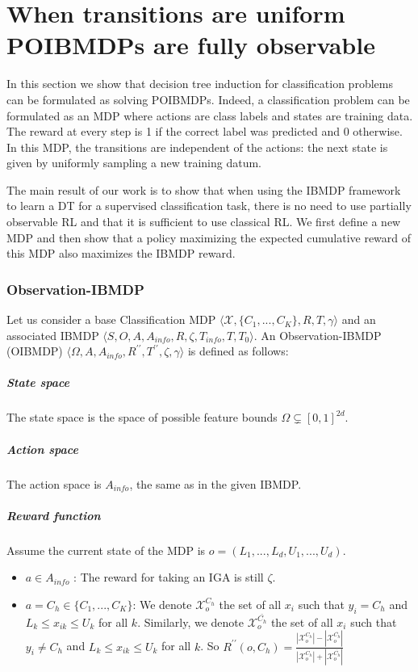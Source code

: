 \chapter{When transitions are uniform POIBMDPs are fully observable}
In this section we show that decision tree induction for classification problems can be formulated as solving POIBMDPs.
Indeed, a classification problem can be formulated as an MDP where actions are class labels and states are training data.
The reward at every step is 1 if the correct label was predicted and 0 otherwise.
In this MDP, the transitions are independent of the actions: the next state is given by uniformly sampling a new training datum. 

The main result of our work is to show that when using the IBMDP framework to learn a DT for a supervised classification task, there is no need to use partially observable RL and that it is sufficient to use classical RL. We first define a new MDP and then show that a policy maximizing the expected cumulative reward of this MDP also maximizes the IBMDP reward. 

\subsection{Observation-IBMDP}
\label{sec:oibmdp}
Let us consider a base Classification MDP $\langle \mathcal{X}, \{C_1, ..., C_K\}, R, T, \gamma \rangle$ 
and an associated IBMDP $\langle S, O, A, A_{info}, R, \zeta, T_{info}, T, T_0 \rangle$. An Observation-IBMDP (OIBMDP) $\langle \Omega, A, A_{info}, R^{\prime\prime}, T^{\prime\prime}, \zeta, \gamma \rangle$ is defined as follows:

\paragraph{State space}
\vskip -0.1in
The state space is the space of possible feature bounds $\Omega \subsetneq [0,1]^{2d}$.

\paragraph{Action space} 
\vskip -0.1in
The action space is $A_{info}$, the same as in the given IBMDP.

\paragraph{Reward function}
\vskip -0.1in
Assume the current state of the MDP is $o = (L_1, ..., L_d, U_1, ..., U_d)$.
\begin{itemize}
    \item $a \in A_{info}$ : The reward for taking an IGA is still $\zeta$.
    \item $a = C_h \in \{C_1, ..., C_K\}$:  We denote $\mathcal{X}^{C_h}_{o}$ the set of all $x_i$ such that $y_i = C_h$ and $ L_k \leq x_{ik} \leq U_k$ for all $k$. Similarly, we denote $\mathcal{X}^{\bar{C_h}}_{o}$ the set of all $x_i$ such that $y_i \neq C_h$ and $ L_k \leq x_{ik} \leq U_k$ for all $k$. So $R^{\prime\prime}(o, C_h) = \frac{|\mathcal{X}^{C_h}_{o}|- |\mathcal{X}^{\bar{C_h}}_{o}|}{|\mathcal{X}^{C_h}_{o}| +|\mathcal{X}^{\bar{C_h}}_{o}|}$
\end{itemize}

